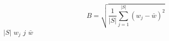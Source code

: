 \documentclass{article}
\begin{document}
\[ B = \sqrt{\frac{1}{|S|} \sum_{j=1}^{|S|} (w_j - \bar{w})^2} \]
$|S|$
$w_{j}$
$j$
$\bar {w}$
\end{document}
